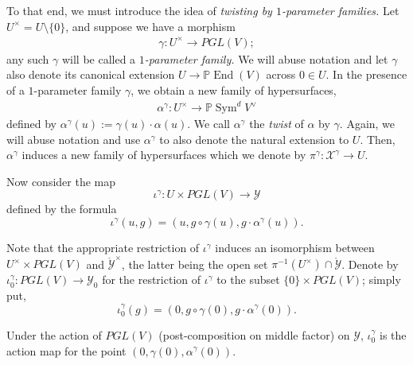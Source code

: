 \documentclass[12 pt, reqno]{amsart}
\theoremstyle{definition}
\newcommand{\on}{\operatorname}
\newcommand{\mb}{\mathbb}
\renewcommand{\P}{\mb{P}}
\begin{document}

To that end, we must introduce the idea of {\sl twisting by
  $1$-parameter families.}  Let $U^{\times} = U \setminus \{0\}$, and
suppose we have a morphism
\begin{align}
  \label{eq:gammatwist}
  \gamma: U^{\times} \to PGL(V);
\end{align}
any such $\gamma$ will be called a {\sl $1$-parameter family.}  We
will abuse notation and let $\gamma$ also denote its canonical
extension $U \to \P \on{End}(V)$ across $0 \in U$.  In the presence of
a $1$-parameter family $\gamma$, we obtain a new family of
hypersurfaces,
\begin{align}
  \label{eq:twist}
  \alpha^{\gamma}: U^{\times} \to \P \on{Sym}^{d}V^{\vee} 
\end{align}
defined by $\alpha^{\gamma}(u) := \gamma(u) \cdot \alpha(u)$. We call
$\alpha^{\gamma}$ the {\sl twist} of $\alpha$ by $\gamma$.  Again, we
will abuse notation and use $\alpha^{\gamma}$ to also denote the
natural extension to $U$. Then, $\alpha^{\gamma}$ induces a new family
of hypersurfaces which we denote by
$\pi^{\gamma}: \mathcal{X}^{\gamma} \to U$.


Now consider the map
\[\iota^{\gamma}: U \times PGL(V) \to \mathcal{Y}\] defined by the formula
\[\iota^{\gamma}(u,g) = (u, g \circ \gamma(u), g \cdot
  \alpha^{\gamma}(u)).\]

Note that the appropriate restriction of $\iota^{\gamma}$ induces an
isomorphism between $U^{\times} \times PGL(V)$ and
$\mathring{\mathcal{Y}}^{\times}$, the latter being the open set
$\pi^{-1}(U^{\times}) \cap \mathring{\mathcal{Y}}$.  Denote by
$\iota^{\gamma}_{0}: PGL(V) \to \mathcal{Y}_{0}$ for the restriction
of $\iota^{\gamma}$ to the subset $\{0 \} \times PGL(V)$; simply put,
\[\iota^{\gamma}_{0}(g) = (0, g \circ \gamma(0), g \cdot
  \alpha^{\gamma}(0)).\]

Under the action of $PGL(V)$ (post-composition on middle factor) on
$\mathcal{Y}$, $\iota^{\gamma}_0$ is the action map for the point
$(0, \gamma(0), \alpha^{\gamma}(0))$.
\end{document}
